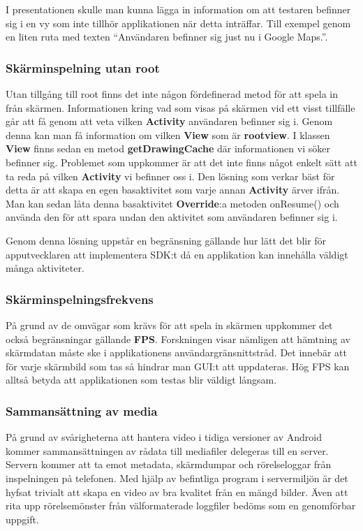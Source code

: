 I presentationen skulle man kunna lägga in information om att testaren befinner sig i en vy som inte tillhör applikationen när detta inträffar. Till exempel genom en liten ruta med texten ``Användaren befinner sig just nu i Google Maps.''.

\subsubsection{Skärminspelning utan root}
\label{screenrecordingwithoutroot}
Utan tillgång till root finns det inte någon fördefinerad metod för att spela in från skärmen. Informationen kring vad som visas på skärmen vid ett visst tillfälle går att få genom att veta vilken \textbf{Activity} användaren befinner sig i. Genom denna kan man få information om vilken \textbf{View} som är \textbf{rootview}. I klassen \textbf{View} finns sedan en metod \textbf{getDrawingCache} där informationen vi söker befinner sig. Problemet som uppkommer är att det inte finns något enkelt sätt att ta reda på vilken \textbf{Activity} vi befinner oss i. Den lösning som verkar bäst för detta är att skapa en egen basaktivitet som varje annan \textbf{Activity} ärver ifrån. Man kan sedan låta denna basaktivitet \textbf{Override}:a metoden onResume() och använda den för att spara undan den aktivitet som användaren befinner sig i.

Genom denna lösning uppstår en begränsning gällande hur lätt det blir för apputvecklaren att implementera SDK:t då en applikation kan innehålla väldigt många aktiviteter. 

\subsubsection{Skärminspelningsfrekvens}
På grund av de omvägar som krävs för att spela in skärmen uppkommer det också begränsningar gällande \textbf{FPS}. Forskningen visar nämligen att hämtning av skärmdatan måste ske i applikationens användargränsnittstråd. Det innebär att för varje skärmbild som tas så hindrar man GUI:t att uppdateras. Hög FPS kan alltså betyda att applikationen som testas blir väldigt långsam.

\subsubsection{Sammansättning av media}
På grund av svårigheterna att hantera video i tidiga versioner av Android kommer sammansättningen av rådata till mediafiler delegeras till en server. Servern kommer att ta emot metadata, skärmdumpar och rörelseloggar från inspelningen på telefonen. Med hjälp av befintliga program i servermiljön är det hyfsat trivialt att skapa en video av bra kvalitet från en mängd bilder. Även att rita upp rörelsemönster från välformaterade loggfiler bedöms som en genomförbar uppgift.

